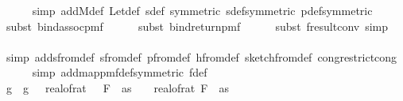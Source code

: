 \begin{isabellebody}
\ \ \ \ \isamarkupfalse%
\ {\isacharparenleft}{\kern0pt}simp\ add{\isacharcolon}{\kern0pt}M{\isacharunderscore}{\kern0pt}def\ Let{\isacharunderscore}{\kern0pt}def\ sdef\ {\isacharbrackleft}{\kern0pt}symmetric{\isacharbrackright}{\kern0pt}\ sdef{\isacharbrackleft}{\kern0pt}symmetric{\isacharbrackright}{\kern0pt}\ p{\isacharunderscore}{\kern0pt}def{\isacharbrackleft}{\kern0pt}symmetric{\isacharbrackright}{\kern0pt}{\isacharparenright}{\kern0pt}\isanewline
\ \ \ \ \isamarkupfalse%
\ {\isacharparenleft}{\kern0pt}subst\ bind{\isacharunderscore}{\kern0pt}assoc{\isacharunderscore}{\kern0pt}pmf{\isacharparenright}{\kern0pt}\isanewline
\ \ \ \ \isamarkupfalse%
\ {\isacharparenleft}{\kern0pt}subst\ bind{\isacharunderscore}{\kern0pt}return{\isacharunderscore}{\kern0pt}pmf{\isacharparenright}{\kern0pt}\isanewline
\ \ \ \ \isamarkupfalse%
\ {\isacharparenleft}{\kern0pt}subst\ f{}{\isacharunderscore}{\kern0pt}result{\isacharunderscore}{\kern0pt}conv{\isacharcomma}{\kern0pt}\ simp{\isacharparenright}{\kern0pt}\isanewline
\ \ \ \ \isamarkupfalse%
\ {\isacharparenleft}{\kern0pt}simp\ add{\isacharcolon}{\kern0pt}sfrom{\isacharunderscore}{\kern0pt}def\ sfrom{\isacharunderscore}{\kern0pt}def\ p{\isacharunderscore}{\kern0pt}from{\isacharunderscore}{\kern0pt}def\ h{\isacharunderscore}{\kern0pt}from{\isacharunderscore}{\kern0pt}def\ sketch{\isacharunderscore}{\kern0pt}from{\isacharunderscore}{\kern0pt}def\ cong{\isacharcolon}{\kern0pt}restrict{\isacharunderscore}{\kern0pt}cong{\isacharparenright}{\kern0pt}\isanewline
\ \ \ \ \isamarkupfalse%
\ {\isacharparenleft}{\kern0pt}simp\ add{\isacharcolon}{\kern0pt}map{\isacharunderscore}{\kern0pt}pmf{\isacharunderscore}{\kern0pt}def{\isacharbrackleft}{\kern0pt}symmetric{\isacharbrackright}{\kern0pt}\ f{\isacharunderscore}{\kern0pt}def{\isacharparenright}{\kern0pt}\isanewline
\isanewline
\ \ \isamarkupfalse%
\ g\ \ {\isachardoublequoteopen}g\ {\isacharequal}{\kern0pt}\ {\isacharparenleft}{\kern0pt}{\isasymlambda}{\isasymomega}{\isachardot}{\kern0pt}\ real{\isacharunderscore}{\kern0pt}of{\isacharunderscore}{\kern0pt}rat\ {\isacharparenleft}{\kern0pt}{\isasymdelta}\ {\isacharasterisk}{\kern0pt}\ F\ {}\ as{\isacharparenright}{\kern0pt}\ {\isasymge}\ {\isasymbar}{\isasymomega}\ {\isacharminus}{\kern0pt}\ real{\isacharunderscore}{\kern0pt}of{\isacharunderscore}{\kern0pt}rat\ {\isacharparenleft}{\kern0pt}F\ {}\ as{\isacharparenright}{\kern0pt}{\isasymbar}{\isacharparenright}{\kern0pt}{\isachardoublequoteclose}\isanewline

\end{isabellebody}
